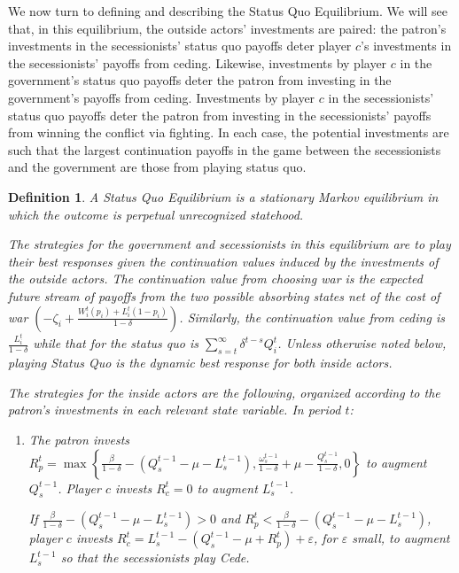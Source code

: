 \documentclass[11pt,letterpaper, notitlepage]{article}
\newtheorem{definition}{Definition}
\newcommand{\de}{\delta}
\newcommand{\ve}{\varepsilon}
\begin{document}
We now turn to defining and describing the Status Quo Equilibrium. We will see that, in this equilibrium, the outside actors' investments are paired: the patron's investments in the secessionists' status quo payoffs deter player $c$'s investments in the secessionists' payoffs from ceding. Likewise, investments by player $c$ in the government's status quo payoffs deter the patron from investing in the government's payoffs from ceding. Investments by player $c$ in the secessionists' status quo payoffs deter the patron from investing in the secessionists' payoffs from winning the conflict via fighting. In each case, the potential  investments are such that the largest continuation payoffs in the game between the secessionists and the government are those from playing status quo.

\begin{definition}
A Status Quo Equilibrium is a stationary Markov equilibrium in which the outcome is perpetual unrecognized statehood.

The strategies for the government and secessionists in this equilibrium are to play their best responses given the continuation values induced by the investments of the outside actors. The continuation value from choosing war is the expected future stream of payoffs from the two possible absorbing states net of the cost of war $\left(-\zeta_i +\frac{W_i^t(p_i)+ L_i^t(1-p_i)}{1-\delta}\right)$. Similarly, the continuation value from ceding is $\frac{L_i^t}{1-\de}$ while that for the status quo is $\sum_{s=t}^\infty \de^{t-s} Q_i^t$. Unless otherwise noted below, playing Status Quo is the dynamic best response for both inside actors.

The strategies for the inside actors are the following, organized according to the patron's investments in each relevant state variable. In period $t$:

\begin{enumerate}
	\item The patron invests $R_p^t = \max\left\{\frac{\beta}{1-\de} - \left( Q_s^{t-1} - \mu - L_s^{t-1}\right),\frac{\omega_s^{t-1}}{1-\de} +\mu - \frac{Q_s^{t-1}}{1-\de},0\right\}$ to augment $Q_s^{t-1}$. Player $c$ invests $R_c^t =0$ to augment $L_s^{t-1}$.

If $\frac{\beta}{1-\de} - \left( Q_s^{t-1} - \mu - L_s^{t-1}\right) > 0$ and $R_p^t < \frac{\beta}{1-\de} - \left( Q_s^{t-1} - \mu - L_s^{t-1}\right)$, player $c$ invests $R_c^t = L_s^{t-1} - \left(Q_s^{t-1} - \mu + R_p^t \right) + \ve$, for $\ve$ small, to augment $L_s^{t-1}$ so that the secessionists play Cede.


\end{enumerate}
\end{definition}
\end{document}
